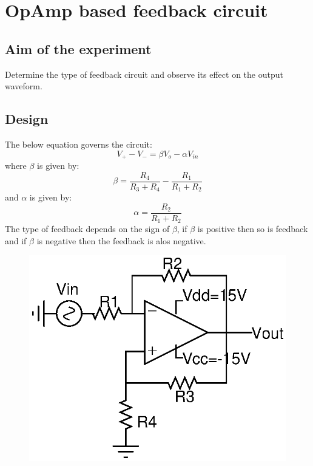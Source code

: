 \documentclass[12pt]{article}
\begin{document}
\newpage
\section{OpAmp based feedback circuit}
\subsection{Aim of the experiment}
Determine the type of feedback circuit and observe its effect on the output waveform.
\subsection{Design}
The below equation governs the circuit:
 \begin{equation}
     V_{+} - V_{-} = \beta V_{o} - \alpha V_{in}
 \end{equation}  
where $\beta$ is given by:
 \begin{equation}
     \beta = \frac{R_{4}}{R_{3} + R_{4}} - \frac{R_{1}}{R_{1} + R_{2}}
 \end{equation}   
 and $\alpha$ is given by:
 \begin{equation}
     \alpha = \frac{R_{2}}{R_{1} + R_{2}}
 \end{equation}   
 The type of feedback depends on the sign of $\beta$, if $\beta$ is positive then so is feedback and if $\beta$ is negative then the feedback is alos negative.
 
\begin{figure}[h!]
\centering
\includegraphics[scale = 1]{Exp_3.eps}
\end{figure}
\end{document}

